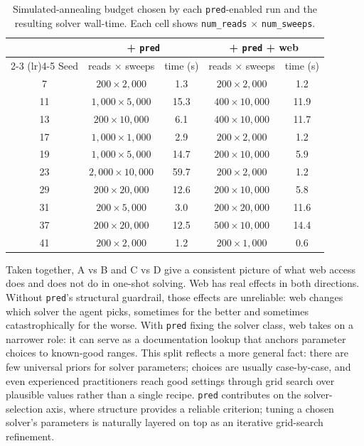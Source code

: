\documentclass{article}
\begin{document}
\begin{table}[!ht]
\caption{Simulated-annealing budget chosen by each \texttt{pred}-enabled run and the resulting solver wall-time. Each cell shows \texttt{num\_reads} $\times$ \texttt{num\_sweeps}.}
\label{tab:end-user-sa-hyperparams}
\centering
\small
\begin{tabular}{@{}ccccc@{}}
\toprule
       & \multicolumn{2}{c}{+ \texttt{pred}} & \multicolumn{2}{c}{+ \texttt{pred} + web} \\
\cmidrule(lr){2-3} \cmidrule(lr){4-5}
Seed   & reads $\times$ sweeps      & time (s) & reads $\times$ sweeps      & time (s) \\
\midrule
 7 & $200 \times 2{,}000$           &  1.3 & $200 \times 2{,}000$           &  1.2 \\
11 & $1{,}000 \times 5{,}000$       & 15.3 & $400 \times 10{,}000$          & 11.9 \\
13 & $200 \times 10{,}000$          &  6.1 & $400 \times 10{,}000$          & 11.7 \\
17 & $1{,}000 \times 1{,}000$       &  2.9 & $200 \times 2{,}000$           &  1.2 \\
19 & $1{,}000 \times 5{,}000$       & 14.7 & $200 \times 10{,}000$          &  5.9 \\
23 & $2{,}000 \times 10{,}000$      & 59.7 & $200 \times 2{,}000$           &  1.2 \\
29 & $200 \times 20{,}000$          & 12.6 & $200 \times 10{,}000$          &  5.8 \\
31 & $200 \times 5{,}000$           &  3.0 & $200 \times 20{,}000$          & 11.6 \\
37 & $200 \times 20{,}000$          & 12.5 & $500 \times 10{,}000$          & 14.4 \\
41 & $200 \times 2{,}000$           &  1.2 & $200 \times 1{,}000$           &  0.6 \\
\bottomrule
\end{tabular}
\end{table}

Taken together, A vs B and C vs D give a consistent picture of what web access does and does not do in one-shot solving. Web has real effects in both directions. Without \texttt{pred}'s structural guardrail, those effects are unreliable: web changes which solver the agent picks, sometimes for the better and sometimes catastrophically for the worse. With \texttt{pred} fixing the solver class, web takes on a narrower role: it can serve as a documentation lookup that anchors parameter choices to known-good ranges. This split reflects a more general fact: there are few universal priors for solver parameters; choices are usually case-by-case, and even experienced practitioners reach good settings through grid search over plausible values rather than a single recipe. \texttt{pred} contributes on the solver-selection axis, where structure provides a reliable criterion; tuning a chosen solver's parameters is naturally layered on top as an iterative grid-search refinement.


\clearpage

\end{document}
